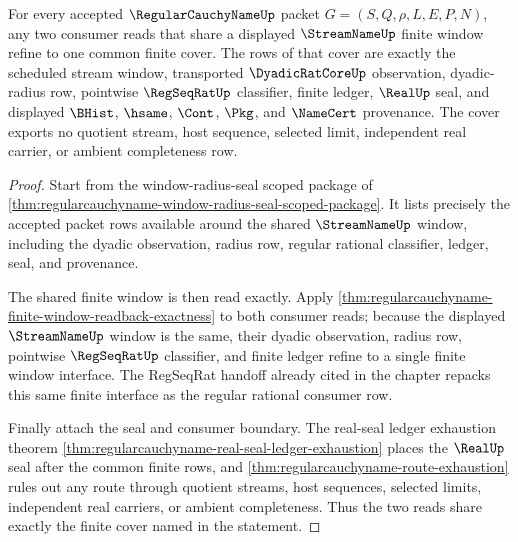 \begin{theorem}
\label{thm:regularcauchyname-stream-window-refinement-cover}
For every accepted $\RegularCauchyNameUp$ packet $G=(S,Q,\rho,L,E,P,N)$, any two consumer reads that share a displayed $\StreamNameUp$ finite window refine to one common finite cover. The rows of that cover are exactly the scheduled stream window, transported $\DyadicRatCoreUp$ observation, dyadic-radius row, pointwise $\RegSeqRatUp$ classifier, finite ledger, $\RealUp$ seal, and displayed $\BHist$, $\hsame$, $\Cont$, $\Pkg$, and $\NameCert$ provenance. The cover exports no quotient stream, host sequence, selected limit, independent real carrier, or ambient completeness row.
\end{theorem}
\begin{proof}
Start from the window-radius-seal scoped package of \autoref{thm:regularcauchyname-window-radius-seal-scoped-package}. It lists precisely the accepted packet rows available around the shared $\StreamNameUp$ window, including the dyadic observation, radius row, regular rational classifier, ledger, seal, and provenance.

The shared finite window is then read exactly. Apply \autoref{thm:regularcauchyname-finite-window-readback-exactness} to both consumer reads; because the displayed $\StreamNameUp$ window is the same, their dyadic observation, radius row, pointwise $\RegSeqRatUp$ classifier, and finite ledger refine to a single finite window interface. The RegSeqRat handoff already cited in the chapter repacks this same finite interface as the regular rational consumer row.

Finally attach the seal and consumer boundary. The real-seal ledger exhaustion theorem \autoref{thm:regularcauchyname-real-seal-ledger-exhaustion} places the $\RealUp$ seal after the common finite rows, and \autoref{thm:regularcauchyname-route-exhaustion} rules out any route through quotient streams, host sequences, selected limits, independent real carriers, or ambient completeness. Thus the two reads share exactly the finite cover named in the statement.
\end{proof}

